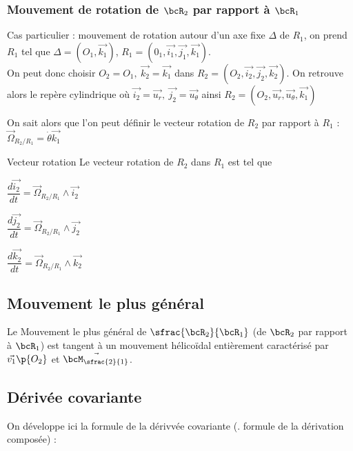     \subsubsection{Mouvement de rotation de $\bcR_2$ par rapport à $\bcR_1$}
    
    Cas particulier : mouvement de rotation autour d'un axe fixe \(\Delta\) de \(R_1\), on prend \(R_1\) tel que \(\Delta = (O_1, \vec{k_1})\), \(R_1 = (0_1, \vec{i_1}, \vec{j_1}, \vec{k_1})\). \\
    On peut donc choisir \(O_2 = O_1,\  \vec{k_2} = \vec{k_1}\) dans \(R_2 = (O_2, \vec{i_2}, \vec{j_2}, \vec{k_2})\). On retrouve alors le repère cylindrique où \(\vec{i_2} = \vec{u_r},\ \vec{j_2} = \vec{u_{\theta}}\) ainsi \(R_2 = (O_2, \vec{u_r}, \vec{u_{\theta}}, \vec{k_1})\) \newline

    On sait alors que l'on peut définir le vecteur rotation de \(R_2\) par rapport à \(R_1\) : \(\vec{\Omega}_{R_2/R_1} = \dot{\theta}\vec{k_1}\)

    \begin{definition}{Vecteur rotation}{}
        Le vecteur rotation de \(R_2\) dans \(R_1\) est tel que 
        \begin{enumerate}
            \itt \( \dfrac{d \vec{i_2}}{dt} = \vec{\Omega}_{R_2/R_1} \wedge \vec{i_2}\)

            \itt \( \dfrac{d \vec{j_2}}{dt} = \vec{\Omega}_{R_2/R_1} \wedge \vec{j_2}\)

            \itt \( \dfrac{d \vec{k_2}}{dt} = \vec{\Omega}_{R_2/R_1} \wedge \vec{k_2}\)
        \end{enumerate}
    \end{definition}
    
    \subsection{Mouvement le plus général}
    
    Le Mouvement le plus général de $\sfrac{\bcR_2}{\bcR_1}$ (de $\bcR_2$ par rapport à $\bcR_1$) est tangent à un mouvement hélicoïdal entièrement caractérisé par $\vec{v_1}\p{O_2}$ et $\vec{\bcM_{\sfrac{2}{1}}}$.
    
    \subsection{Dérivée covariante}
    
    On développe ici la formule de la dérivvée covariante (\ie. formule de la dérivation composée) :
    
